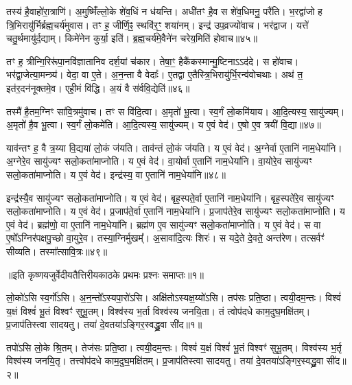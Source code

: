    तस्य॑ है॒वाहो॑रा॒त्राणि॑।
   अ॒मुष्मिँ॑ल्लो॒के शे॑व॒धिं न ध॑यन्ति।
   अधी॑तꣳ है॒व स शे॑व॒धिमनु॒ परै॑ति।
   भ॒रद्वा॑जो ह त्रि॒भिरायु॑र्भिर्ब्रह्म॒चर्य॑मुवास।
   तꣳ ह॒ जीर्णि॒ꣴ॒ स्थवि॑र॒ꣳ॒ शया॑नम्।
   इन्द्र॑ उप॒व्रज्यो॑वाच।
   भर॑द्वाज।
   यत्ते॑ चतु॒र्थमायु॑र्द॒द्याम्।
   किमे॑नेन कुर्या॒ इति॑।
   ब्र॒ह्म॒चर्य॑मे॒वैने॑न चरेय॒मिति॑ होवाच॥४५॥

   तꣳ ह॒ त्रीन्गि॒रिरू॑पा॒नवि॑ज्ञातानिव दर्\mbox{}श॒यां च॑कार।
   तेषा॒ꣳ॒ हैकै॑कस्मान्मु॒ष्टिनाऽऽद॑दे।
   स हो॑वाच।
   भर॑द्वा॒जेत्या॒मन्त्र्य॑।
   वेदा॒ वा ए॒ते।
   अ॒न॒न्ता वै वेदाः᳚।
   ए॒तद्वा ए॒तैस्त्रि॒भिरायु॑र्भि॒रन्व॑\-वोचथाः।
   अथ॑ त॒ इत॑र॒दन॑नूक्तमे॒व।
   एही॒मं वि॑द्धि।
   अ॒यं वै स॑र्ववि॒द्येति॑॥४६॥

   तस्मै॑ है॒तम॒ग्निꣳ सा॑वि॒त्रमु॑वाच।
   तꣳ स वि॑दि॒त्वा।
   अ॒मृतो॑ भू॒त्वा।
   स्व॒र्गं लो॒कमि॑याय।
   आ॒दि॒त्यस्य॒ सायु॑ज्यम्।
   अ॒मृतो॑ है॒व भू॒त्वा।
   स्व॒र्गं लो॒कमे॑ति।
   आ॒दि॒त्यस्य॒ सायु॑ज्यम्।
   य ए॒वं वेद॑।
   ए॒षो ए॒व त्रयी॑ वि॒द्या॥४७॥

   याव॑न्तꣳ ह॒ वै त्र॒य्या वि॒द्यया॑ लो॒कं ज॑यति।
   ताव॑न्तं लो॒कं ज॑यति।
   य ए॒वं वेद॑।
   अ॒ग्नेर्वा ए॒तानि॑ नाम॒धेया॑नि।
   अ॒ग्नेरे॒व सायु॑ज्यꣳ सलो॒कता॑माप्नोति।
   य ए॒वं वेद॑।
   वा॒योर्वा ए॒तानि॑ नाम॒धेया॑नि।
   वा॒योरे॒व सायु॑ज्यꣳ सलो॒कता॑माप्नोति।
   य ए॒वं वेद॑।
   इन्द्र॑स्य॒ वा ए॒तानि॑ नाम॒धेया॑नि॥४८॥

   इन्द्र॑स्यै॒व सायु॑ज्यꣳ सलो॒कता॑माप्नोति।
   य ए॒वं वेद॑।
   बृह॒स्पते॒र्वा ए॒तानि॑ नाम॒धेया॑नि।
   बृह॒स्पते॑रे॒व सायु॑ज्यꣳ सलो॒कता॑माप्नोति।
   य ए॒वं वेद॑।
   प्र॒जाप॑ते॒र्वा ए॒तानि॑ नाम॒धेया॑नि।
   प्र॒जाप॑तेरे॒व सायु॑ज्यꣳ सलो॒कता॑माप्नोति।
   य ए॒वं वेद॑।
   ब्रह्म॑णो॒ वा ए॒तानि॑ नाम॒धेया॑नि।
   ब्रह्म॑ण ए॒व सायु॑ज्यꣳ सलो॒कता॑माप्नोति।
   य ए॒वं वेद॑।
   स वा ए॒षो᳚ऽग्निर॑पक्षपु॒च्छो वा॒युरे॒व।
   तस्या॒ग्निर्मुखम्᳚।
   अ॒सावा॑दि॒त्यः शिरः॑।
   स यदे॒ते दे॒वते॒ अन्त॑रेण।
   तत्सर्वꣳ॑ सीव्यति।
   तस्मा᳚त्सावि॒त्रः॥४९॥
   \anuvakamend
   
॥इति कृष्णयजुर्वेदीयतैत्तिरीयकाठके प्रथमः प्रश्नः समाप्तः॥१॥

\setcounter{anuvakam}{0}

   लो॒को॑ऽसि स्व॒र्गो॑ऽसि।
   अ॒न॒न्तो᳚ऽस्यपा॒रो॑ऽसि।
   अक्षि॑तो\-ऽस्यक्ष॒य्यो॑\-ऽसि।
   तप॑सः प्रति॒ष्ठा।
   त्वयी॒दम॒न्तः।
   विश्वं॑ य॒क्षं विश्वं॑ भू॒तं विश्वꣳ॑ सुभू॒तम्।
   विश्व॑स्य भ॒र्ता विश्व॑स्य जनयि॒ता।
   तं त्वोप॑दधे काम॒दुघ॒मक्षि॑तम्।
   प्र॒जाप॑तिस्त्वा सादयतु।
   तया॑ दे॒वतया॑ऽङ्गिर॒स्वद्ध्रु॒वा सी॑द॥१॥

   तपो॑ऽसि लो॒के श्रि॒तम्।
   तेज॑सः प्रति॒ष्ठा।
   त्वयी॒दम॒न्तः।
   विश्वं॑ य॒क्षं विश्वं॑ भू॒तं विश्वꣳ॑ सुभू॒तम्।
   विश्व॑स्य भ॒र्तृ विश्व॑स्य जनयि॒तृ।
   तत्त्वोप॑दधे काम॒दुघ॒मक्षि॑तम्।
   प्र॒जाप॑तिस्त्वा सादयतु।
   तया॑ दे॒वतया॑ऽङ्गिर॒स्वद्ध्रु॒वा सी॑द॥२॥

